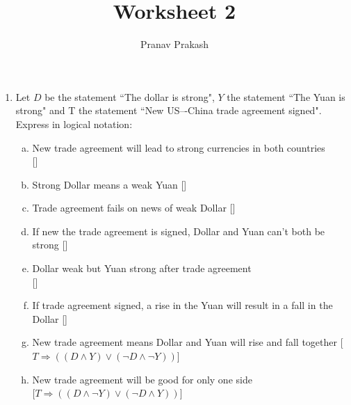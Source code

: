 \documentclass[]{article}
\begin{document}
\title{Worksheet 2}
\author{Pranav Prakash}
\maketitle

\newcommand\answerbox[2][1.25in]{\hspace*{\fill}[\makebox[#1]{#2}]}

\begin{enumerate}
	\item Let $D$ be the statement ``The dollar is strong", $Y$ the statement ``The Yuan is strong" and T the statement ``New US–-China trade agreement signed". Express in logical notation:
	\begin{enumerate}[(a)]
		\item New trade agreement will lead to strong currencies in both countries \\\answerbox{$T \Rightarrow (D \wedge Y)$}
		\item Strong Dollar means a weak Yuan
			\answerbox{$D \Rightarrow \neg Y$}
		\item Trade agreement fails on news of weak Dollar
			\answerbox{$\neg D \Rightarrow \neg T$}
		\item If new the trade agreement is signed, Dollar and Yuan can't both be strong \answerbox{$T \Rightarrow \neg(D \wedge Y)$}
		\item Dollar weak but Yuan strong after trade agreement \\
			\answerbox{$T \Rightarrow \neg D \wedge Y$}
		\item If trade agreement signed, a rise in the Yuan will result in a fall in the Dollar
			\answerbox{$T \Rightarrow (Y \Rightarrow \neg D)$}
		\item New trade agreement means Dollar and Yuan will rise and fall together
			\hspace*{\fill} [$T \Rightarrow ((D \wedge Y) \vee (\neg D \wedge \neg Y))$]
		\item New trade agreement will be good for only one side \\
			\hspace*{\fill} [$T \Rightarrow ((D \wedge \neg Y) \vee (\neg D \wedge Y))$]
	\end{enumerate}
\end{enumerate}
\end{document}
